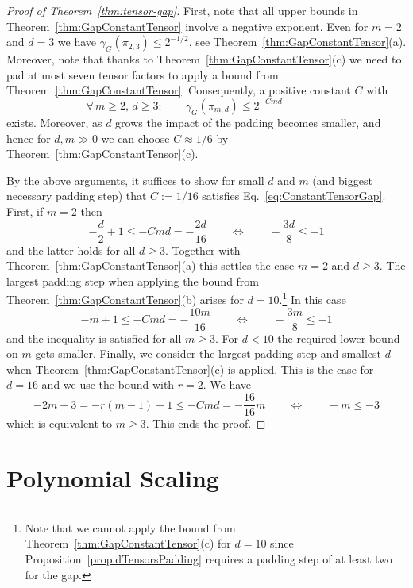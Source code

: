\begin{proof}[Proof of Theorem~\ref{thm:tensor-gap}]
	First, note that all upper bounds in Theorem~\ref{thm:GapConstantTensor} involve a negative exponent. Even for $m=2$ and $d=3$ we have $\gamma_G(\pi_{2,3}) \leq 2^{-1/2}$, see Theorem~\ref{thm:GapConstantTensor}(a).
	Moreover, note that thanks to Theorem~\ref{thm:GapConstantTensor}(c) we need to pad at most seven tensor factors to apply a bound from Theorem~\ref{thm:GapConstantTensor}. 
	Consequently, a positive constant $C$ with
		\begin{equation}\label{eq:ConstantTensorGap}
			\forall \, m \geq 2, \, d \geq 3 \colon \qquad \gamma_{G}(\pi_{m,d}) \leq 2^{-Cmd} \qquad \qquad
		\end{equation}
	exists. Moreover, as $d$ grows the impact of the padding becomes smaller, and hence for $d,m \gg 0$ we can choose $C \approx 1/6$ by Theorem~\ref{thm:GapConstantTensor}(c).
	
	By the above arguments, it suffices to show for small $d$ and $m$ (and biggest necessary padding step) that $C := 1/16$ satisfies Eq.~\eqref{eq:ConstantTensorGap}. First, if $m=2$ then
		\[ - \frac{d}{2} +1 \leq - C md = - \frac{2d}{16}  \qquad \Leftrightarrow \qquad - \frac{3d}{8} \leq -1 \]
	and the latter holds for all $d \geq 3$. Together with Theorem~\ref{thm:GapConstantTensor}(a) this settles the case $m=2$ and $d \geq 3$. The largest padding step when applying the bound from Theorem~\ref{thm:GapConstantTensor}(b) arises for $d=10$.\footnote{Note that we cannot apply the bound from Theorem~\ref{thm:GapConstantTensor}(c) for $d=10$ since Proposition~\ref{prop:dTensorsPadding} requires a padding step of at least two for the gap.}
	In this case 
		\[ -m+1 \leq -Cmd = - \frac{10m}{16} \qquad \Leftrightarrow \qquad - \frac{3m}{8} \leq - 1\]
	and the inequality is satisfied for all $m \geq 3$. For $d < 10$ the required lower bound on $m$ gets smaller. Finally, we consider the largest padding step and smallest $d$ when Theorem~\ref{thm:GapConstantTensor}(c) is applied. This is the case for $d=16$ and we use the bound with $r=2$. We have
		\[ -2m + 3  = -r(m-1) +1 \leq -Cmd = - \frac{16}{16} m \qquad \Leftrightarrow \qquad -m \leq -3 \]
	which is equivalent to $m \geq 3$. This ends the proof.
\end{proof}



 \section{Polynomial Scaling} \label{sec:PolynomialsGap}

